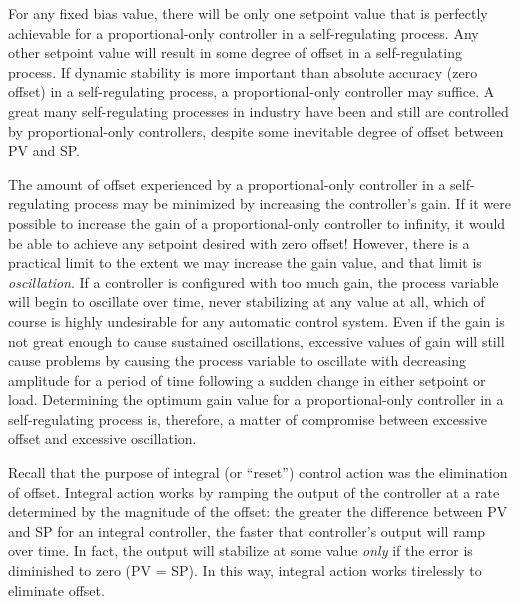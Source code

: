 For any fixed bias value, there will be only one setpoint value that is perfectly achievable for a proportional-only controller in a self-regulating process.  Any other setpoint value will result in some degree of offset in a self-regulating process.  If dynamic stability is more important than absolute accuracy (zero offset) in a self-regulating process, a proportional-only controller may suffice.  A great many self-regulating processes in industry have been and still are controlled by proportional-only controllers, despite some inevitable degree of offset between PV and SP.

The amount of offset experienced by a proportional-only controller in a self-regulating process may be minimized by increasing the controller's gain.  If it were possible to increase the gain of a proportional-only controller to infinity, it would be able to achieve any setpoint desired with zero offset!  However, there is a practical limit to the extent we may increase the gain value, and that limit is \textit{oscillation}.  If a controller is configured with too much gain, the process variable will begin to oscillate over time, never stabilizing at any value at all, which of course is highly undesirable for any automatic control system.  Even if the gain is not great enough to cause sustained oscillations, excessive values of gain will still cause problems by causing the process variable to oscillate with decreasing amplitude for a period of time following a sudden change in either setpoint or load.  Determining the optimum gain value for a proportional-only controller in a self-regulating process is, therefore, a matter of compromise between excessive offset and excessive oscillation.

\vskip 10pt

Recall that the purpose of integral (or ``reset'') control action was the elimination of offset.  Integral action works by ramping the output of the controller at a rate determined by the magnitude of the offset: the greater the difference between PV and SP for an integral controller, the faster that controller's output will ramp over time.  In fact, the output will stabilize at some value \textit{only} if the error is diminished to zero (PV = SP).  In this way, integral action works tirelessly to eliminate offset.


